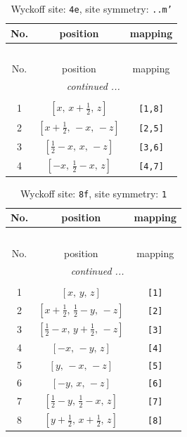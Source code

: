 \documentclass[fleqn,8pt]{jsarticle}
\begin{document}
\begin{longtable}{ccc}
\caption{Wyckoff site: {\tt 4e}, site symmetry: {\tt ..m'}}
 \\
 \hline \hline
No. & position & mapping \\ \hline \endfirsthead

\multicolumn{2}{l}{\tablename\ \thetable{}} \\
 \hline \hline
No. & position & mapping \\ \hline \endhead

 \hline \hline
\multicolumn{2}{r}{\footnotesize\it continued ...} \\ \endfoot

 \hline \hline
\multicolumn{2}{r}{} \\ \endlastfoot

1 & $\left[ x,\, x + \frac{1}{2},\, z \right]$ & {\tt [1,8]} \\ \hline
2 & $\left[ x + \frac{1}{2},\, - x,\, - z \right]$ & {\tt [2,5]} \\ \hline
3 & $\left[ \frac{1}{2} - x,\, x,\, - z \right]$ & {\tt [3,6]} \\ \hline
4 & $\left[ - x,\, \frac{1}{2} - x,\, z \right]$ & {\tt [4,7]} \\
\end{longtable}
\renewcommand{\arraystretch}{1.2}
\begin{longtable}{ccc}
\caption{Wyckoff site: {\tt 8f}, site symmetry: {\tt 1}}
 \\
 \hline \hline
No. & position & mapping \\ \hline \endfirsthead

\multicolumn{2}{l}{\tablename\ \thetable{}} \\
 \hline \hline
No. & position & mapping \\ \hline \endhead

 \hline \hline
\multicolumn{2}{r}{\footnotesize\it continued ...} \\ \endfoot

 \hline \hline
\multicolumn{2}{r}{} \\ \endlastfoot

1 & $\left[ x,\, y,\, z \right]$ & {\tt [1]} \\ \hline
2 & $\left[ x + \frac{1}{2},\, \frac{1}{2} - y,\, - z \right]$ & {\tt [2]} \\ \hline
3 & $\left[ \frac{1}{2} - x,\, y + \frac{1}{2},\, - z \right]$ & {\tt [3]} \\ \hline
4 & $\left[ - x,\, - y,\, z \right]$ & {\tt [4]} \\ \hline
5 & $\left[ y,\, - x,\, - z \right]$ & {\tt [5]} \\ \hline
6 & $\left[ - y,\, x,\, - z \right]$ & {\tt [6]} \\ \hline
7 & $\left[ \frac{1}{2} - y,\, \frac{1}{2} - x,\, z \right]$ & {\tt [7]} \\ \hline
8 & $\left[ y + \frac{1}{2},\, x + \frac{1}{2},\, z \right]$ & {\tt [8]} \\
\end{longtable}
\end{document}
